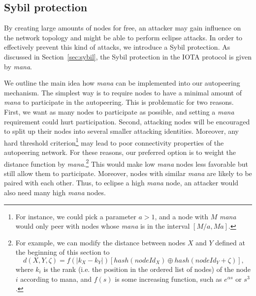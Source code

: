 \documentclass[../main.tex]{subfiles}
\begin{document}
\subsection{Sybil protection}

By creating large amounts of nodes for free, an attacker may gain influence on the network topology and might be able to perform eclipse attacks.
In order to effectively prevent this kind of attacks, we introduce a Sybil protection.  
As discussed in Section~\ref{sec:sybil}, the Sybil protection in the IOTA protocol is given by \emph{mana}. 

We outline the main idea how \emph{mana} can be implemented into our autopeering mechanism. 
%
The simplest way is to require nodes to have a minimal amount of \emph{mana} to participate in the autopeering. 
%
This is problematic for two reasons. 
%
First, we want as many nodes to participate as possible, and setting a \emph{mana} requirement could hurt participation. 
%
Second, attacking nodes will be encouraged to split up their nodes into several smaller attacking identities. 
%
Moreover, any hard threshold criterion\footnote{For instance, we could pick a parameter $a>1$, and a node with $M$ \emph{mana} would only peer with nodes whose \emph{mana} is in the interval $[M/a,Ma]$.} may lead to poor connectivity properties of the autopeering network. 
%
For these reasons, our preferred option is to weight the distance function by \emph{mana}.\footnote{For example, we can modify the distance between nodes $X$ and $Y$ defined at the beginning of this section to $$    d(X, Y, \zeta) = f(|k_X-k_Y|)\left[hash(nodeId_X ) \oplus hash(nodeId_Y+ \zeta)\right],
$$ where $k_i$ is the rank (i.e. the position in the ordered list of nodes) of the node $i$ according to mana, and $f(s)$ is some increasing function, such as $e^{\alpha s}$ or $s^3$.}
%
This would make low \emph{mana} nodes less favorable but still allow them to participate. 
%
Moreover, nodes with similar \emph{mana} are likely to be paired with each other.  Thus, to eclipse a high \emph{mana}  node, an attacker would also need many high \emph{mana}  nodes.  
\end{document}
